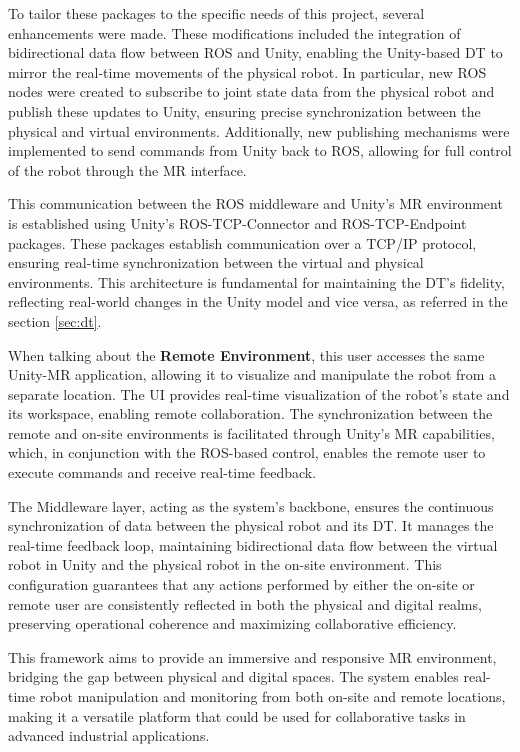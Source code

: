To tailor these packages to the specific needs of this project, several enhancements were made. These modifications included the integration of bidirectional data flow between \ac{ROS} and Unity, enabling the Unity-based \ac{DT} to mirror the real-time movements of the physical robot. In particular, new \ac{ROS} nodes were created to subscribe to joint state data from the physical robot and publish these updates to Unity, ensuring precise synchronization between the physical and virtual environments. Additionally, new publishing mechanisms were implemented to send commands from Unity back to \ac{ROS}, allowing for full control of the robot through the \ac{MR} interface. 

This communication between the \ac{ROS} middleware and Unity’s \ac{MR} environment is established using Unity’s \ac{ROS}-\ac{TCP}-Connector and \ac{ROS}-\ac{TCP}-Endpoint packages. These packages establish communication over a \ac{TCP}/\ac{IP} protocol, ensuring real-time synchronization between the virtual and physical environments. This architecture is fundamental for maintaining the \ac{DT}'s fidelity, reflecting real-world changes in the Unity model and vice versa, as referred in the section \ref{sec:dt}.

When talking about the \textbf{Remote Environment}, this user accesses the same Unity-\ac{MR} application, allowing it to visualize and manipulate the robot from a separate location. The \ac{UI} provides real-time visualization of the robot’s state and its workspace, enabling remote collaboration. The synchronization between the remote and on-site environments is facilitated through Unity’s \ac{MR} capabilities, which, in conjunction with the \ac{ROS}-based control, enables the remote user to execute commands and receive real-time feedback.

The Middleware layer, acting as the system’s backbone, ensures the continuous synchronization of data between the physical robot and its \ac{DT}. It manages the real-time feedback loop, maintaining bidirectional data flow between the virtual robot in Unity and the physical robot in the on-site environment. This configuration guarantees that any actions performed by either the on-site or remote user are consistently reflected in both the physical and digital realms, preserving operational coherence and maximizing collaborative efficiency.

This framework aims to provide an immersive and responsive \ac{MR} environment, bridging the gap between physical and digital spaces. The system enables real-time robot manipulation and monitoring from both on-site and remote locations, making it a versatile platform that could be used for collaborative tasks in advanced industrial applications. 


